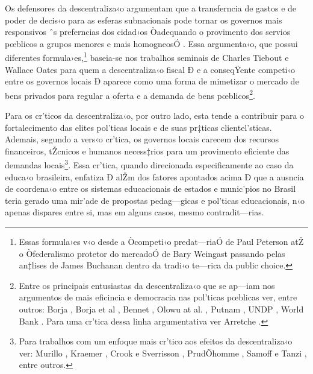 \documentclass[a4paper, 12pt]{article}
\begin{document}
Os defensores da descentraliza‹o argumentam que a transferncia de gastos e de poder de decis‹o para as esferas subnacionais pode tornar os governos mais responsivos ˆs preferncias dos cidad‹os Òadequando o provimento dos servios pœblicos a grupos menores e mais homogneosÓ \cite{wallis_impact_1998}. Essa argumenta‹o, que possui diferentes formula›es,\footnote{Essas formula›es v‹o desde a Òcompeti‹o predat—riaÓ de Paul Peterson \citeyear{peterson_price_1995} atŽ o Òfederalismo protetor do mercadoÓ de Bary Weingast \citeyear{weingast_economic_1995} passando pelas an‡lises de James Buchanan \citeyear{buchanan_federalism_1995} dentro da tradi‹o te—rica da public choice.} baseia-se nos trabalhos seminais de Charles Tiebout \citeyear{tiebout_pure_1956} e Wallace Oates \citeyear{oates_fiscal_1972} para quem a descentraliza‹o fiscal Ð e a conseqŸente competi‹o entre os governos locais Ð aparece como uma forma de mimetizar o mercado de bens privados para regular a oferta e a demanda de bens pœblicos\footnote{Entre os principais entusiastas da descentraliza‹o que se ap—iam nos argumentos de mais eficincia e democracia nas pol’ticas pœblicas ver, entre outros: Borja \citeyear{borja_descentralizacion_1987},  Borja et al \citeyear{borja_estado_1989}, Bennet \citeyear{bennett_decentralization_1990}, Olowu at al. \citeyear{olowu_local_2004} , Putnam \citeyear{putnam_making_1994} , UNDP \citeyear{united_human_1993} , World Bank \citeyear{world_world_1994}. Para uma cr’tica dessa linha argumentativa ver Arretche \citeyear{arretche_mitos_1996}.}.

Para os cr’ticos da descentraliza‹o, por outro lado, esta tende a contribuir para o fortalecimento das elites pol’ticas locais e de suas pr‡ticas clientel’sticas. Ademais, segundo a vers‹o cr’tica, os governos locais carecem dos recursos financeiros, tŽcnicos e humanos necess‡rios para um provimento eficiente das demandas locais\footnote{Para trabalhos com um enfoque mais cr’tico aos efeitos da descentraliza‹o ver: Murillo \citeyear{murillo_recovering_1999}, Kraemer \citeyear{kraemer_intergovernmental_1997}, Crook e Sverrisson \citeyear{crook_what_1999}, PrudÕhomme \citeyear{prudhomme_dangers_1995}, Samoff \citeyear{samoff_decentralization_1990} e Tanzi \citeyear{tanzi_fiscal_1996}, entre outros.}. Essa cr’tica, quando direcionada especificamente ao caso da educa‹o brasileira, enfatiza Ð alŽm dos fatores apontados acima Ð que a ausncia de coordena‹o entre os sistemas educacionais de estados e munic’pios no Brasil teria gerado uma mir’ade de propostas pedag—gicas e pol’ticas educacionais, n‹o apenas dispares entre si, mas em alguns casos, mesmo contradit—rias.
\end{document}
